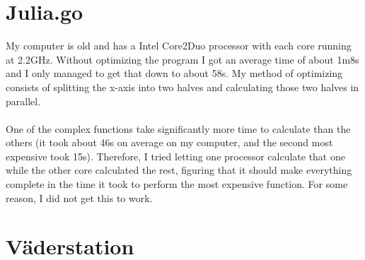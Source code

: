 \documentclass[a4paper,10pt,twoside]{article}
\begin{document}
\section{Julia.go}
My computer is old and has a Intel Core2Duo processor with each core running at 2.2GHz. Without optimizing the program I got an average time of about 1m8s and I only managed to get that down to about 58s. My method of optimizing consists of splitting the x-axis into two halves and calculating those two halves in parallel. \\
\\
One of the complex functions take significantly more time to calculate than the others (it took about 46s on average on my computer, and the second most expensive took 15s). Therefore, I tried letting one processor calculate that one while the other core calculated the rest, figuring that it should make everything complete in the time it took to perform the most expensive function. For some reason, I did not get this to work.


\section{Väderstation}

\end{document}
